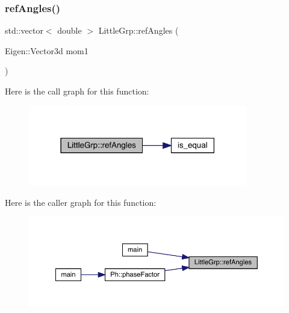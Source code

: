 \subsubsection{\texorpdfstring{refAngles()}{refAngles()}}
{\footnotesize\ttfamily std\+::vector$<$ double $>$ Little\+Grp\+::ref\+Angles (\begin{DoxyParamCaption}\item[{Eigen\+::\+Vector3d}]{mom1 }\end{DoxyParamCaption})}

Here is the call graph for this function\+:\nopagebreak
\begin{figure}[H]
\begin{center}
\leavevmode
\includegraphics[width=271pt]{d1/d4c/namespaceLittleGrp_a93937e135b6b9c963ae9ad26516e252d_cgraph}
\end{center}
\end{figure}
Here is the caller graph for this function\+:
\nopagebreak
\begin{figure}[H]
\begin{center}
\leavevmode
\includegraphics[width=350pt]{d1/d4c/namespaceLittleGrp_a93937e135b6b9c963ae9ad26516e252d_icgraph}
\end{center}
\end{figure}
